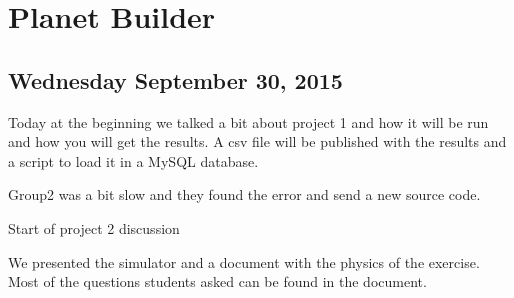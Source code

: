 \section{Planet Builder}
\subsection{Wednesday September 30, 2015 }
Today at the beginning we talked a bit about project 1 and how it will be run 
and how you will get the results. A csv file will be published with the results 
and a script to load it in a MySQL database.

Group2 was a bit slow and they found the error and send a new source code.

Start of project 2 discussion

We presented the simulator and a document with the physics of the exercise. Most of the questions students asked can be found in the document.

